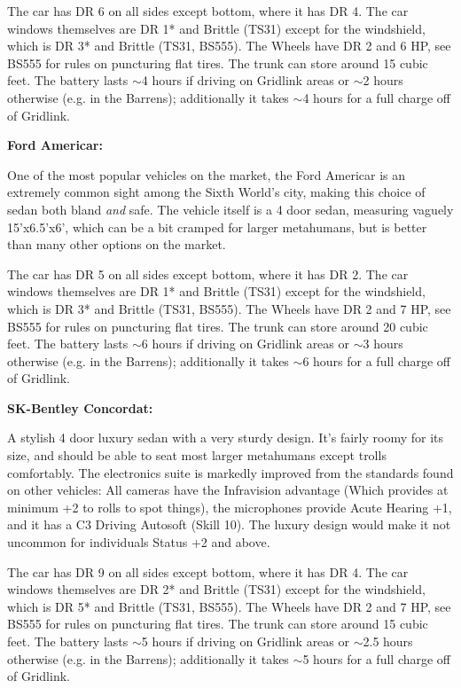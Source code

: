 The car has DR 6 on all sides except bottom, where it has DR 4. The car windows themselves are DR 1* and Brittle (TS31) except for the windshield, which is DR 3* and Brittle (TS31, BS555). The Wheels have DR 2 and 6 HP, see BS555 for rules on puncturing flat tires. The trunk can store around 15 cubic feet. The battery lasts $\sim$4 hours if driving on Gridlink areas or $\sim$2 hours otherwise (e.g. in the Barrens); additionally it takes $\sim$4 hours for a full charge off of Gridlink.

\textbf{Ford Americar:} 

One of the most popular vehicles on the market, the Ford Americar is an extremely common sight among the Sixth World's city, making this choice of sedan both bland \textit{and} safe. The vehicle itself is a 4 door sedan, measuring vaguely 15'x6.5'x6', which can be a bit cramped for larger metahumans, but is better than many other options on the market.

The car has DR 5 on all sides except bottom, where it has DR 2. The car windows themselves are DR 1* and Brittle (TS31) except for the windshield, which is DR 3* and Brittle (TS31, BS555). The Wheels have DR 2 and 7 HP, see BS555 for rules on puncturing flat tires. The trunk can store around 20 cubic feet. The battery lasts $\sim$6 hours if driving on Gridlink areas or $\sim$3 hours otherwise (e.g. in the Barrens); additionally it takes $\sim$6 hours for a full charge off of Gridlink.

\textbf{SK-Bentley Concordat:}

A stylish 4 door luxury sedan with a very sturdy design. It's fairly roomy for its size, and should be able to seat most larger metahumans except trolls comfortably. The electronics suite is markedly improved from the standards found on other vehicles: All cameras have the Infravision advantage (Which provides at minimum +2 to rolls to spot things), the microphones provide Acute Hearing +1, and it has a C3 Driving Autosoft (Skill 10). The luxury design would make it not uncommon for individuals Status +2 and above.

The car has DR 9 on all sides except bottom, where it has DR 4. The car windows themselves are DR 2* and Brittle (TS31) except for the windshield, which is DR 5* and Brittle (TS31, BS555). The Wheels have DR 2 and 7 HP, see BS555 for rules on puncturing flat tires. The trunk can store around 15 cubic feet. The battery lasts $\sim$5 hours if driving on Gridlink areas or $\sim$2.5 hours otherwise (e.g. in the Barrens); additionally it takes $\sim$5 hours for a full charge off of Gridlink.

